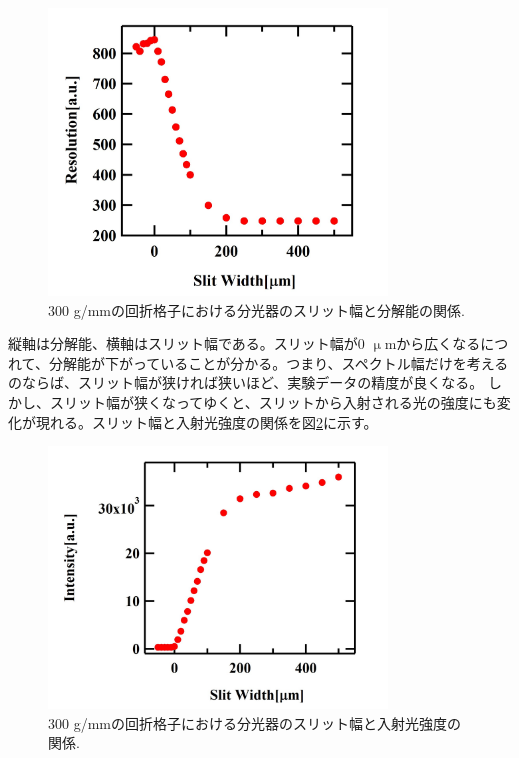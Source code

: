 \documentclass[11pt,a4j]{jsarticle}
\begin{document}
\begin{enumerate}
       \begin{figure}[ht]
        \centering
        \includegraphics[clip,width=9cm]{start1_300Resolution.jpg}
        \caption{300 g/mmの回折格子における分光器のスリット幅と分解能の関係.}
        \label{fig_300resolution1}
       \end{figure}

       縦軸は分解能、横軸はスリット幅である。スリット幅が0 $\upmu$mから広くなるにつれて、分解能が下がっていることが分かる。つまり、スペクトル幅だけを考えるのならば、スリット幅が狭ければ狭いほど、実験データの精度が良くなる。
       しかし、スリット幅が狭くなってゆくと、スリットから入射される光の強度にも変化が現れる。スリット幅と入射光強度の関係を図\ref{fig_300Int1}に示す。

       \newpage
       \begin{figure}[ht]
        \centering
        \includegraphics[clip,width=9cm]{start1_300Int.jpg}
        \caption{300 g/mmの回折格子における分光器のスリット幅と入射光強度の関係.}
        \label{fig_300Int1}
       \end{figure}



\end{enumerate}
\end{document}
